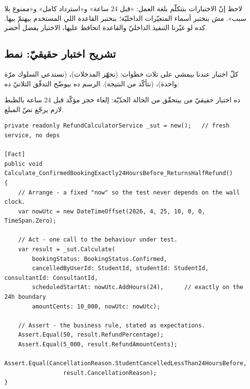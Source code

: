 \begin{keyp}
لاحظ إنّ الاختبارات بتتكلّم بلغة العمل: «قبل \textenglish{24} ساعة» و«استرداد كامل» و«ممنوع بلا سبب». مش بنختبر أسماء المتغيّرات الداخليّة؛ بنختبر القاعدة اللي المستخدم بيهتمّ بيها. كده لو غيّرنا التنفيذ الداخليّ والقاعدة اتحافظ عليها، الاختبار يفضل أخضر.
\end{keyp}

\subsection{تشريح اختبار حقيقيّ: نمط }

كلّ اختبار عندنا بيمشي على تلات خطوات:  (نجهّز المدخلات)،  (نستدعي السلوك مرّة واحدة)،  (نتأكّد من النتيجة). الرسم ده بيوضّح التدفّق التلاتيّ ده:

\begin{center}\begin{LTR}
\end{LTR}\end{center}

ده اختبار حقيقيّ من  بيتحقّق من الحالة الحدّيّة: إلغاء حجز مؤكّد قبل \textenglish{24} ساعة بالظبط لازم يرجّع نصّ المبلغ.

\begin{english}
\begin{lstlisting}[language={[Sharp]C}]
private readonly RefundCalculatorService _sut = new();   // fresh service, no deps

[Fact]
public void Calculate_ConfirmedBookingExactly24HoursBefore_ReturnsHalfRefund()
{
    // Arrange - a fixed "now" so the test never depends on the wall clock.
    var nowUtc = new DateTimeOffset(2026, 4, 25, 10, 0, 0, TimeSpan.Zero);

    // Act - one call to the behaviour under test.
    var result = _sut.Calculate(
        bookingStatus: BookingStatus.Confirmed,
        cancelledByUserId: StudentId, studentId: StudentId, consultantId: ConsultantId,
        scheduledStartAt: nowUtc.AddHours(24),      // exactly on the 24h boundary
        amountCents: 10_000, nowUtc: nowUtc);

    // Assert - the business rule, stated as expectations.
    Assert.Equal(50, result.RefundPercentage);
    Assert.Equal(5_000, result.RefundAmountCents);
    Assert.Equal(CancellationReason.StudentCancelledLessThan24HoursBefore,
                 result.CancellationReason);
}
\end{lstlisting}
\end{english}

